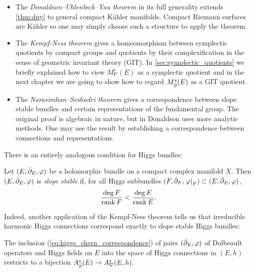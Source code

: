 \documentclass[12pt]{ociamthesis}  %
\begin{document}
\begin{itemize}
  \item The \emph{Donaldson–Uhlenbeck–Yau theorem}
        \cite{donaldson1985,uy1986}
        in its full generality extends \ref{thm:duy} to general compact
        K\"ahler manifolds. Compact Riemann surfaces
        are K\"ahler so one may simply choose such a structure to
        apply the theorem.
  \item The \emph{Kempf-Ness theorem} \cite{kn1979} gives a homeomorphism between
        symplectic quotients by compact groups and quotients by their
        complexification in the sense of geometric invariant theory (GIT). In
        \ref{sec:symplectic_quotients} we briefly
        explained how to view $M^s_\nabla(E)$ as a symplectic quotient
        and in the next chapter we are going to show how to regard
        $M^s_{\bar{\partial}}(E)$ as a GIT quotient.
  \item The \emph{Narasimhan–Seshadri theorem} \cite{ns1965} gives
        a correspondence between slope stable bundles and certain representations
        of the fundamental group. The original proof is algebraic in nature, but in \cite{donaldson1983} Donaldson
        uses more analytic methods. One may use the result by establishing
        a correspondence between connections and representations.
\end{itemize}

There is an entirely analogous condition for Higgs bundles:
\begin{definition}\label{def:stable_higgs_bundle}
  Let $(E,{\bar{\partial}}_E,\varphi)$ be a holomorphic bundle on a compact complex
  manifold $X$. Then $(E,{\bar{\partial}}_E,\varphi)$ is \emph{slope stable}
  if, for all Higgs subbundles
  $(F,{\bar{\partial}}_F,\left.{\varphi}\right\vert_{F})\subset (E,{\bar{\partial}}_E,\varphi)$,
  \begin{align}\label{eq:higgs_stability}
    \frac{\deg F}{\operatorname{rank} F} < \frac{\deg E}{\operatorname{rank} E}.
  \end{align}
\end{definition}

Indeed, another application of the Kempf-Ness theorem tells us that
irreducible harmonic Higgs connections correspond exactly to slope stable
Higgs bundles:


\begin{theorem}
  The inclusion (\ref{eq:higgs_chern_correspondence}) of pairs
  $({\bar{\partial}}_E,\varphi)$ of Dolbeault operators and Higgs fields on $E$
  into the space of Higgs connections in $(E,h)$ restricts to a bijection
  $A^s_{\bar{\partial}}(E) \to A^s_\nabla(E,h).$
\end{theorem}
\end{document}
